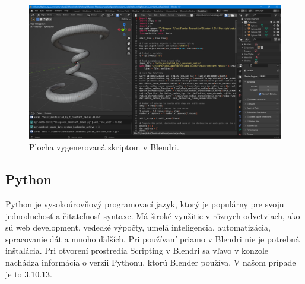 \begin{figure}[h]
	\centering
	\includegraphics[width=\textwidth]{images/blender.png}
	\caption[Softvér Blender.]{Plocha vygenerovaná skriptom v Blendri.}
	\label{fig:blender}
\end{figure}

\subsection{Python}
Python je vysokoúrovňový programovací jazyk, ktorý je populárny pre svoju jednoduchosť a čitateľnosť syntaxe. Má široké využitie v rôznych odvetviach, ako sú web development, vedecké výpočty, umelá inteligencia, automatizácia, spracovanie dát a mnoho ďalších. Pri používaní priamo v Blendri nie je potrebná inštalácia. Pri otvorení prostredia Scripting v Blendri sa vľavo v konzole nachádza informácia o verzii Pythonu, ktorú Blender používa. V našom prípade je to 3.10.13.
